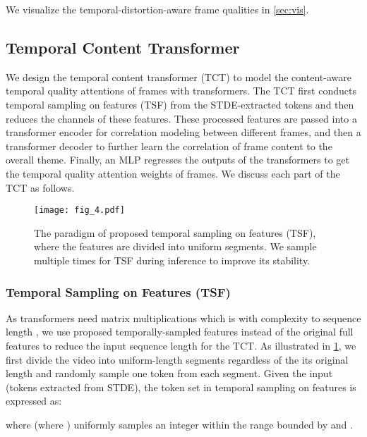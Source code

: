 \documentclass[journal]{IEEEtran}
\begin{document}
We visualize the temporal-distortion-aware frame qualities  in \cref{sec:vis}.



\subsection {Temporal Content Transformer} \label{sec:32}



We design the temporal content transformer (TCT) to model the content-aware temporal quality attentions of frames with transformers. The TCT first conducts temporal sampling on features (TSF) from the STDE-extracted tokens  and then reduces the channels of these features. These processed features are passed into a transformer encoder for correlation modeling between different frames, and then a transformer decoder to further learn the correlation of frame content to the overall theme. Finally, an MLP regresses the outputs of the transformers to get the temporal quality attention weights of frames. We discuss each part of the TCT as follows.

\begin{figure}
    \centering
    \texttt{[image: fig\_4.pdf]}
    \caption{The paradigm of proposed temporal sampling on features (TSF), where the features are divided into  uniform segments. We sample multiple times for TSF during inference to improve its stability.}
    \label{fig:tss}
\end{figure}

\subsubsection{Temporal Sampling on Features (TSF)} As transformers need matrix multiplications which is with  complexity to sequence length , we use proposed temporally-sampled features instead of the original full features to reduce the input sequence length for the TCT. As illustrated in \cref{fig:tss}, we first divide the video into  uniform-length segments regardless of the its original length and randomly sample one token from each segment. Given the input  (tokens extracted from STDE), the token set in temporal sampling on features  is expressed as:  

where  (where ) uniformly samples an integer within the range bounded by  and . 
\end{document}
